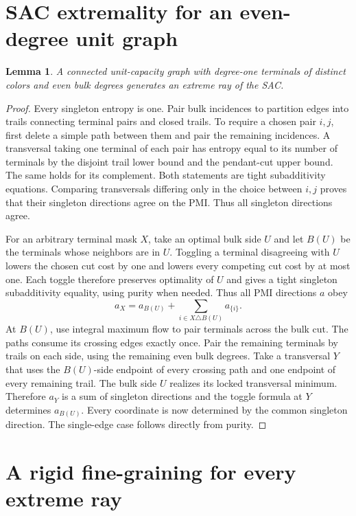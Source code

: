 \documentclass[11pt]{article}
\newtheorem{lemma}[theorem]{Lemma}
\begin{document}
\section{SAC extremality for an even-degree unit graph}
\label{app:even}

\begin{lemma}
\label{lem:even-lift}
A connected unit-capacity graph with degree-one terminals of distinct
colors and even bulk degrees generates an extreme ray of the SAC.
\end{lemma}

\begin{proof}
Every singleton entropy is one. Pair bulk incidences to partition
edges into trails connecting terminal pairs and closed trails. To
require a chosen pair \(i,j\), first delete a simple path between
them and pair the remaining incidences. A transversal taking one
terminal of each pair has entropy equal to its number of terminals
by the disjoint trail lower bound and the pendant-cut upper bound.
The same holds for its complement. Both statements are tight
subadditivity equations. Comparing transversals differing only in
the choice between \(i,j\) proves that their singleton directions
agree on the PMI. Thus all singleton directions agree.

For an arbitrary terminal mask \(X\), take an optimal bulk side \(U\)
and let \(B(U)\) be the terminals whose neighbors are in \(U\).
Toggling a terminal disagreeing with \(U\) lowers the chosen cut cost
by one and lowers every competing cut cost by at most one. Each
toggle therefore preserves optimality of \(U\) and gives a tight
singleton subadditivity equality, using purity when needed.
Thus all PMI directions \(a\) obey
\[
 a_X=a_{B(U)}+\sum_{i\in X\triangle B(U)}a_{\{i\}}.
\]
At \(B(U)\), use integral maximum flow to pair terminals across
the bulk cut. The paths consume its crossing edges exactly once.
Pair the remaining terminals by trails on each side, using the
remaining even bulk degrees. Take a transversal \(Y\) that uses the
\(B(U)\)-side endpoint of every crossing path and one endpoint of
every remaining trail. The bulk side \(U\) realizes its locked
transversal minimum. Therefore \(a_Y\) is a sum of singleton
directions and the toggle formula at \(Y\) determines \(a_{B(U)}\).
Every coordinate is now determined by the common singleton
direction. The single-edge case follows directly from purity.
\end{proof}

\section{A rigid fine-graining for every extreme ray}
\label{app:universal}
\end{document}
